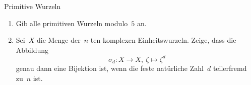 \documentclass{algblatt}
\begin{document}
\begin{aufgabe}{Primitive Wurzeln}
\begin{enumerate}
\item Gib alle primitiven Wurzeln modulo~$5$ an.

\item Sei~$X$ die Menge der~$n$-ten komplexen Einheitswurzeln. Zeige, dass die
Abbildung
\[ \sigma_d : X \longrightarrow X,\ \zeta \longmapsto \zeta^d \]
genau dann eine Bijektion ist, wenn die feste natürliche Zahl~$d$ teilerfremd
zu~$n$ ist.
\end{enumerate}
\end{aufgabe}
\end{document}
